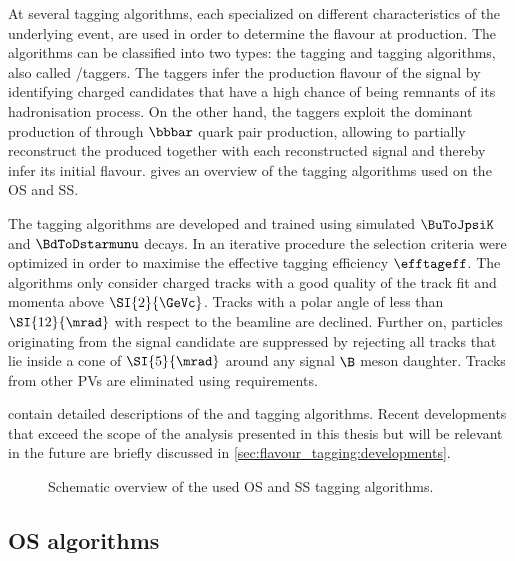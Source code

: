 At \LHCb several tagging algorithms, each specialized on different
characteristics of the underlying event, are used in order to determine the
\Bmeson flavour at production. The algorithms can be classified into two types:
the \SS tagging and \OS tagging algorithms, also called \SS/\OS taggers. The \SS
taggers infer the production flavour of the signal \Bmeson by identifying
charged candidates that have a high chance of being remnants of its
hadronisation process. On the other hand, the \OS taggers exploit the dominant
production of \Bmesons through $\bbbar$ quark pair production, allowing to
partially reconstruct the \bhadron produced together with each reconstructed
signal \Bmeson and thereby infer its initial flavour.
 gives an overview of the tagging
algorithms used on the \acl{OS} and \acl{SS}.

The tagging algorithms are developed and trained using simulated $\BuToJpsiK$
and $\BdToDstarmunu$ decays. In an iterative procedure the selection criteria
were optimized in order to maximise the effective tagging efficiency
$\efftageff$. The algorithms only consider charged tracks with a good quality of
the track fit and momenta above $\SI{2}{\GeVc}$. Tracks with a polar angle of
less than $\SI{12}{\mrad}$ with respect to the beamline are declined. Further
on, particles originating from the signal candidate are suppressed by rejecting
all tracks that lie inside a cone of $\SI{5}{\mrad}$ around any signal $\B$
meson daughter. Tracks from other \acp{PV} are eliminated using \IP
requirements.

 contain detailed
descriptions of the \OS and \SS tagging algorithms. Recent developments that
exceed the scope of the analysis presented in this thesis but will be relevant
in the future are briefly discussed in \cref{sec:flavour_tagging:developments}.
%
\begin{figure}
\centering

\caption{Schematic overview of the used \acs*{OS} and \acs*{SS} tagging
algorithms. \cite{wishahi:2013jt}}
\label{fig:flavour_tagging:lhcb:schematics}
\end{figure}

\subsection{\Acl{OS} algorithms}
\label{sec:flavour_tagging:os}

